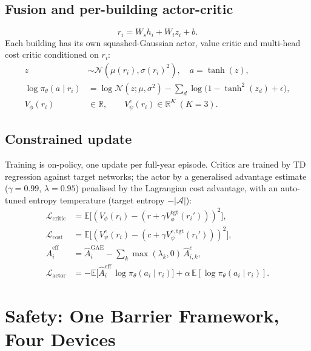 \documentclass[11pt]{article}
\newcommand{\R}{\mathbb{R}}
\begin{document}
\subsection{Fusion and per-building actor-critic}

\begin{equation}
r_i = W_s h_i + W_t z_i + b.
\label{eq:fusion}
\end{equation}
Each building has its own squashed-Gaussian actor, value critic and multi-head
cost critic conditioned on $r_i$:
\begin{align}
z &\sim \mathcal N(\mu(r_i), \sigma(r_i)^2), \quad a = \tanh(z), \\
\log \pi_\theta(a\mid r_i) &= \log \mathcal N(z;\mu,\sigma^2) - \sum_d \log\!\big(1 - \tanh^2(z_d) + \epsilon\big), \\
V_\phi(r_i) &\in \R, \qquad V^c_\psi(r_i) \in \R^K \ (K=3).
\end{align}

\subsection{Constrained update}

Training is on-policy, one update per full-year episode. Critics are trained by
TD regression against target networks; the actor by a generalised advantage
estimate ($\gamma = 0.99$, $\lambda = 0.95$) penalised by the Lagrangian cost
advantage, with an auto-tuned entropy temperature (target entropy
$-|\mathcal A|$):
\begin{align}
\mathcal L_{\text{critic}} &= \mathbb E\big[(V_\phi(r_i) - (r + \gamma V_\phi^{\text{tgt}}(r_i')))^2\big], \\
\mathcal L_{\text{cost}} &= \mathbb E\big[(V^c_\psi(r_i) - (c + \gamma V^{c,\text{tgt}}_\psi(r_i')))^2\big], \\
\hat A_i^{\text{eff}} &= \hat A_i^{\text{GAE}} - \textstyle\sum_k \max(\lambda_k,0)\, \hat A^{c}_{i,k}, \\
\mathcal L_{\text{actor}} &= -\mathbb E\big[\hat A_i^{\text{eff}}\, \log\pi_\theta(a_i\mid r_i)\big] + \alpha\, \mathbb E[\log\pi_\theta(a_i\mid r_i)].
\end{align}

\section{Safety: One Barrier Framework, Four Devices}
\label{sec:safety}
\end{document}
